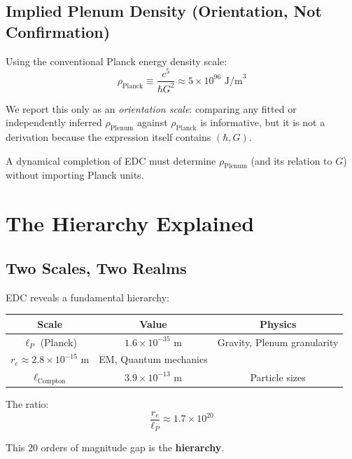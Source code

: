 \subsection{Implied Plenum Density (Orientation, Not Confirmation)}

Using the conventional Planck energy density scale:
\begin{equation}
\rho_{\text{Planck}} \equiv \frac{c^5}{\hbar G^2} \approx 5 \times 10^{96} \text{ J/m}^3
\end{equation}

We report this only as an \textit{orientation scale}: comparing any fitted or independently inferred $\rho_{\text{Plenum}}$ against $\rho_{\text{Planck}}$ is informative, but it is not a derivation because the expression itself contains $(\hbar, G)$.

A dynamical completion of EDC must determine $\rho_{\text{Plenum}}$ (and its relation to $G$) without importing Planck units.

\newpage

\section{The Hierarchy Explained}
\label{sec:hierarchy_explained}

\subsection{Two Scales, Two Realms}

EDC reveals a fundamental hierarchy:

\begin{center}
\begin{tabular}{|c|c|c|}
\hline
\textbf{Scale} & \textbf{Value} & \textbf{Physics} \\
\hline
$\ell_P$ (Planck) & $1.6 \times 10^{-35}$ m & Gravity, Plenum granularity \\
$r_e \approx 2.8 \times 10^{-15}$ m & EM, Quantum mechanics \\
$\ell_{\text{Compton}}$ & $3.9 \times 10^{-13}$ m & Particle sizes \\
\hline
\end{tabular}
\end{center}

The ratio:
\begin{equation}
\frac{r_e}{\ell_P} \approx 1.7 \times 10^{20}
\end{equation}

This 20 orders of magnitude gap is the \textbf{hierarchy}.

